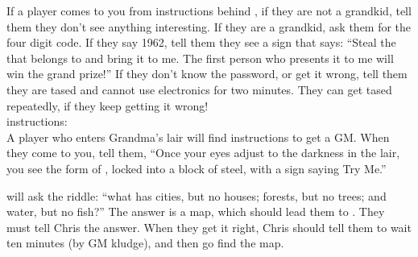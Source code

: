 \documentclass[green]{LRSguildcamp1}
\begin{document}
\name{\gGMHandbook{}}

If a player comes to you from instructions behind \iArtworkThree{}, if they are not a grandkid, tell them they don't see anything interesting.
If they are a grandkid, ask them for the four digit code.  If they say 1962, tell them they see a sign that says: 
``Steal the \iBagofHolding{} that belongs to \cOS{} and bring it to me. The first person who presents it to me will win the grand prize!''
If they don't know the password, or get it wrong, tell them they are tased and cannot use electronics for two minutes.
They can get tased repeatedly, if they keep getting it wrong!
\\
\cChrisHemsworth{\intro} instructions:\\
A player who enters Grandma's lair will find instructions to get a GM.  When they come to you, tell them,
``Once your eyes adjust to the darkness in the lair, you see the form of \cChrisHemsworth{\intro}, locked into a block of steel, with a sign saying Try Me.''

\cChrisHemsworth{} will ask the riddle: ``what has cities, but no houses; forests, but no trees; and water, but no fish?'' The answer is a map, which should lead them to \iArtworkThree{}.  They must tell Chris the answer.  When they get it right, Chris should tell them to wait ten minutes (by GM kludge), and then go find the map.
\end{document}
